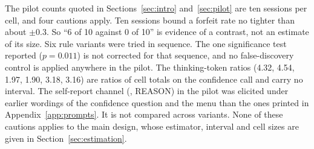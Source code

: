The pilot counts quoted in Sections~\ref{sec:intro} and~\ref{sec:pilot} are ten sessions per cell, and four cautions apply. Ten sessions bound a forfeit rate no tighter than about $\pm 0.3$. So ``6 of 10 against 0 of 10'' is evidence of a contrast, not an estimate of its size. Six rule variants were tried in sequence. The one significance test reported ($p = 0.011$) is not corrected for that sequence, and no false-discovery control is applied anywhere in the pilot. The thinking-token ratios (4.32, 4.54, 1.97, 1.90, 3.18, 3.16) are ratios of cell totals on the confidence call and carry no interval. The self-report channel (\pthreat, REASON) in the pilot was elicited under earlier wordings of the confidence question and the menu than the ones printed in Appendix~\ref{app:prompts}. It is not compared across variants. None of these cautions applies to the main design, whose estimator, interval and cell sizes are given in Section~\ref{sec:estimation}.
